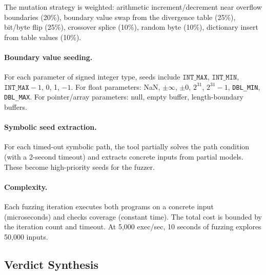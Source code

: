\documentclass[11pt]{article}
\begin{document}
The mutation strategy is weighted: arithmetic increment/decrement near overflow boundaries (20\%), boundary value swap from the divergence table (25\%), bit/byte flip (25\%), crossover splice (10\%), random byte (10\%), dictionary insert from table values (10\%).

\paragraph{Boundary value seeding.} For each parameter of signed integer type, seeds include $\texttt{INT\_MAX}$, $\texttt{INT\_MIN}$, $\texttt{INT\_MAX}-1$, 0, 1, $-1$. For float parameters: NaN, $\pm\infty$, $\pm 0$, $2^{31}$, $2^{31}-1$, \texttt{DBL\_MIN}, \texttt{DBL\_MAX}. For pointer/array parameters: null, empty buffer, length-boundary buffers.

\paragraph{Symbolic seed extraction.} For each timed-out symbolic path, the tool partially solves the path condition (with a 2-second timeout) and extracts concrete inputs from partial models. These become high-priority seeds for the fuzzer.

\paragraph{Complexity.} Each fuzzing iteration executes both programs on a concrete input (microseconds) and checks coverage (constant time). The total cost is bounded by the iteration count and timeout. At 5,000 exec/sec, 10 seconds of fuzzing explores 50,000 inputs.


\subsection{Verdict Synthesis}
\label{sec:alg-verdict}
\end{document}
